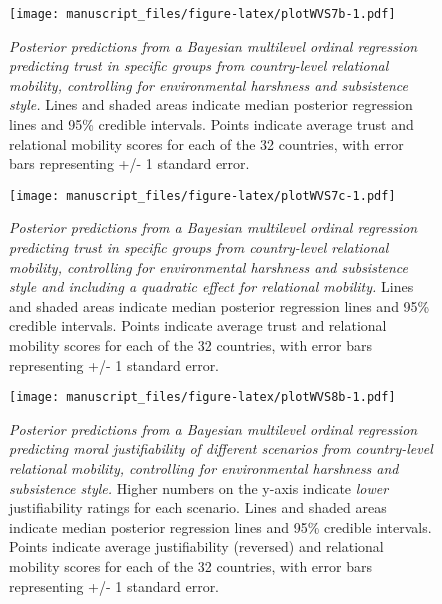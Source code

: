 \documentclass[
  man,floatsintext]{apa6}
\begin{document}
\newpage



\begin{figure}
\centering
\texttt{[image: manuscript\_files/figure-latex/plotWVS7b-1.pdf]}
\caption{\label{fig:plotWVS7b}\emph{Posterior predictions from a Bayesian multilevel ordinal regression predicting trust in specific groups from country-level relational mobility, controlling for environmental harshness and subsistence style.} Lines and shaded areas indicate median posterior regression lines and 95\% credible intervals. Points indicate average trust and relational mobility scores for each of the 32 countries, with error bars representing +/- 1 standard error.}
\end{figure}

\newpage



\begin{figure}
\centering
\texttt{[image: manuscript\_files/figure-latex/plotWVS7c-1.pdf]}
\caption{\label{fig:plotWVS7c}\emph{Posterior predictions from a Bayesian multilevel ordinal regression predicting trust in specific groups from country-level relational mobility, controlling for environmental harshness and subsistence style and including a quadratic effect for relational mobility.} Lines and shaded areas indicate median posterior regression lines and 95\% credible intervals. Points indicate average trust and relational mobility scores for each of the 32 countries, with error bars representing +/- 1 standard error.}
\end{figure}

\newpage



\begin{figure}
\centering
\texttt{[image: manuscript\_files/figure-latex/plotWVS8b-1.pdf]}
\caption{\label{fig:plotWVS8b}\emph{Posterior predictions from a Bayesian multilevel ordinal regression predicting moral justifiability of different scenarios from country-level relational mobility, controlling for environmental harshness and subsistence style.} Higher numbers on the y-axis indicate \emph{lower} justifiability ratings for each scenario. Lines and shaded areas indicate median posterior regression lines and 95\% credible intervals. Points indicate average justifiability (reversed) and relational mobility scores for each of the 32 countries, with error bars representing +/- 1 standard error.}
\end{figure}

\newpage
\end{document}
